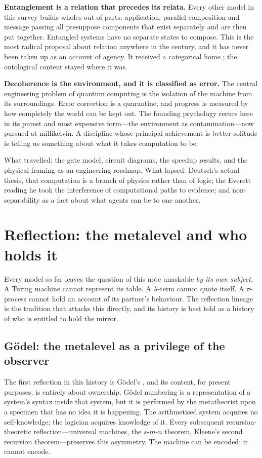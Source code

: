 \documentclass[11pt,a4paper]{article}
\begin{document}
\textbf{Entanglement is a relation that precedes its relata.} Every other model in
this survey builds wholes out of parts: application, parallel composition and
message passing all presuppose components that exist separately and are then put
together. Entangled systems have no separate states to compose. This is the most
radical proposal about relation anywhere in the century, and it has never been
taken up as an account of agency. It received a categorical home
\cite{abramskycoecke2004}; the ontological content stayed where it was.

\textbf{Decoherence is the environment, and it is classified as error.} The
central engineering problem of quantum computing is the isolation of the machine
from its surroundings. Error correction is a quarantine, and progress is measured
by how completely the world can be kept out. The founding psychology recurs here
in its purest and most expensive form---the environment as contamination---now
pursued at millikelvin. A discipline whose principal achievement is better
solitude is telling us something about what it takes computation to be.

What travelled: the gate model, circuit diagrams, the speedup results, and the
physical framing as an engineering roadmap. What lapsed: Deutsch's actual
thesis, that computation is a branch of physics rather than of logic; the
Everett reading he took the interference of computational paths to evidence; and
non-separability as a fact about what agents can be to one another.

\section{Reflection: the metalevel and who holds it}



Every model so far leaves the question of this note unaskable \emph{by its own
subject}. A Turing machine cannot represent its table. A $\lambda$-term cannot
quote itself. A $\pi$-process cannot hold an account of its partner's behaviour.
The reflection lineage is the tradition that attacks this directly, and its
history is best told as a history of who is entitled to hold the mirror.

\subsection{G\"odel: the metalevel as a privilege of the observer}

The first reflection in this history is G\"odel's \cite{godel1931}, and its
content, for present purposes, is entirely about ownership. G\"odel numbering is a
representation of a system's syntax inside that system, but it is performed by the
metatheorist upon a specimen that has no idea it is happening. The arithmetised
system acquires no self-knowledge; the logician acquires knowledge of it. Every
subsequent recursion-theoretic reflection---universal machines, the $s$-$m$-$n$
theorem, Kleene's second recursion theorem---preserves this asymmetry. The machine
can be encoded; it cannot encode.
\end{document}
